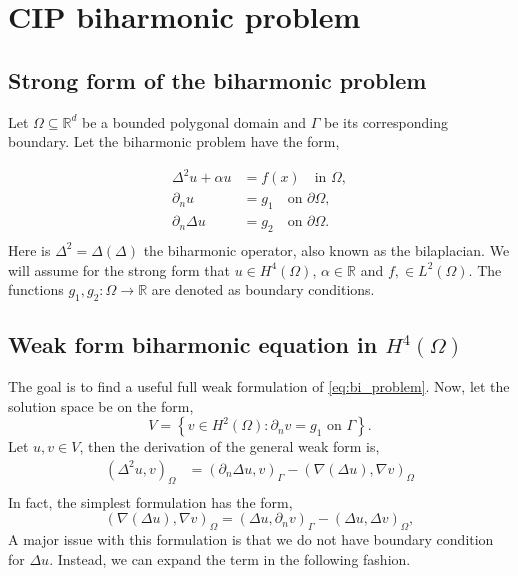 
\newpage
\section{CIP biharmonic problem }%
\label{sec:CIP_biharmonic_problem}




\subsection{Strong form of the biharmonic problem}%
\label{sub:strong_form_of_the_biharmonic_equation}

Let $\Omega \subseteq    \mathbb{R} ^d$ be a bounded polygonal domain and $\Gamma $ be its corresponding boundary. Let the biharmonic problem have the form,

\begin{equation}
\label{eq:bi_problem}
\begin{split}
    \Delta^2  u  + \alpha  u  & = f( x)  \quad \text{in } \Omega,   \\
    \partial _{n} u & = g_{1}  \quad \text{on } \partial \Omega,  \\
    \partial _{n} \Delta  u & = g_{2}  \quad \text{on } \partial \Omega .  \\
\end{split}
\end{equation}
Here is $\Delta ^2 = \Delta  \left( \Delta  \right) $ the biharmonic operator, also known as the bilaplacian. We will assume for the strong form that $u \in H^{4}\left( \Omega  \right) $, $\alpha  \in  \mathbb{R} $ and $f, \in L^{2}\left( \Omega  \right)
$. The functions $g_{1},g_{2}: \Omega  \to \mathbb{R}$ are denoted as boundary conditions.

\subsection{  Weak form biharmonic equation in $H^{4}\left( \Omega  \right) $}%
\label{sub:continious_weak_form_of_biharmonic_equation}

The goal is to find a useful full weak formulation of \eqref{eq:bi_problem}. Now, let the solution space be on the form,
\begin{equation*}
V = \left\{ v \in H^2( \Omega  ) : \partial _{n} v = g_{1}    \text{ on }
\Gamma   \right\}.
\end{equation*}
Let $u,v \in  V$, then the derivation of the general weak form is,
\[
\begin{split}
\left( \Delta ^2 u,v \right) _{\Omega }  &  = \left( \partial _{n} \Delta u, v \right) _{\Gamma  } - \left( \nabla \left( \Delta  u \right) , \nabla v \right) _{\Omega }  \\
\end{split}
\]
In fact, the simplest formulation has the form,
\[
  \left( \nabla \left( \Delta u \right) , \nabla v \right) _{\Omega } =   \left( \Delta u, \partial _{n} v \right) _{\Gamma  } - \left( \Delta u, \Delta v \right)_{\Omega },
\]
A major issue with this formulation is that we do not have boundary condition for $\Delta u$. Instead, we can expand the term in the following fashion.

